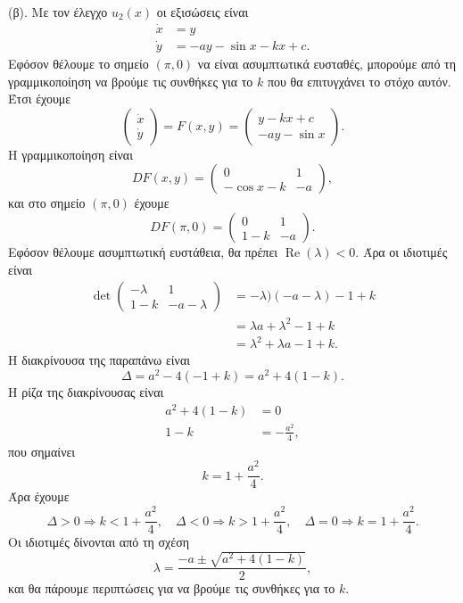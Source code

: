 \begin{solution}
    (β). Με τον έλεγχο \( u_2(x) \) οι εξισώσεις είναι
    \begin{align*}
        \dot{x} &= y \\
        \dot{y} &= -a y - \sin{x} - kx + c.
    \end{align*}
    Εφόσον θέλουμε το σημείο \( (\pi, 0) \) να είναι ασυμπτωτικά ευσταθές,
    μπορούμε από τη γραμμικοποίηση να βρούμε τις συνθήκες για το \( k \) που θα
    επιτυγχάνει το στόχο αυτόν. Έτσι έχουμε
    \[
        \begin{pmatrix}
            \dot{x} \\
            \dot{y}
        \end{pmatrix} = F(x, y) =
        \begin{pmatrix}
            y -kx + c \\
            -a y - \sin{x}
        \end{pmatrix}.
    \]
    Η γραμμικοποίηση είναι
    \[
        DF(x, y) =
        \begin{pmatrix}
            0 & 1 \\
            -\cos{x} - k & -a
        \end{pmatrix},
    \]
    και στο σημείο \( (\pi, 0) \) έχουμε
    \[
        DF(\pi, 0) =
        \begin{pmatrix}
            0 & 1 \\
            1 - k & -a
        \end{pmatrix}.
    \]
    Εφόσον θέλουμε ασυμπτωτική ευστάθεια, θα πρέπει \(
    \operatorname{Re}(\lambda) < 0 \). Άρα οι ιδιοτιμές είναι
    \begin{align*}
        \det{\begin{pmatrix}
                -\lambda & 1 \\
                1 - k & -a - \lambda
        \end{pmatrix}} &=
        -\lambda)(-a - \lambda) - 1 + k \\
        &= \lambda a + \lambda^2 - 1 + k \\
        &= \lambda^2 + \lambda a - 1 + k.
    \end{align*}
    Η διακρίνουσα της παραπάνω είναι
    \[
        \Delta = a^2 - 4(-1 + k) = a^2 + 4(1 - k).
    \]
    Η ρίζα της διακρίνουσας είναι
    \begin{align*}
        a^2 + 4(1 - k) &= 0 \\
        1 - k &= -\frac{a^2}{4},
    \end{align*}
    που σημαίνει
    \[
        k = 1 + \frac{a^2}{4}.
    \]
    Άρα έχουμε
    \[
        \Delta > 0 \Rightarrow k < 1 + \frac{a^2}{4}, \quad
        \Delta < 0 \Rightarrow k > 1 + \frac{a^2}{4}, \quad
        \Delta = 0 \Rightarrow k = 1 + \frac{a^2}{4}.
    \]
    Οι ιδιοτιμές δίνονται από τη σχέση
    \begin{equation}\label{eq:ex10b_lambda}
        \lambda = \frac{-a \pm\sqrt{a^2 + 4(1 - k)}}{2},
    \end{equation}
    και θα πάρουμε περιπτώσεις για να βρούμε τις συνθήκες για το \( k \).


\end{solution}
